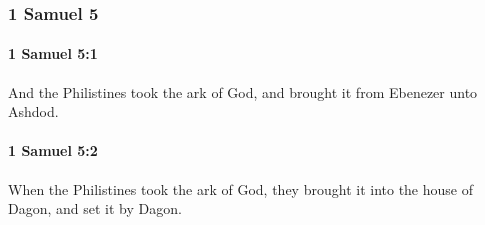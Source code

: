 	\subsubsection{1 Samuel 5} %
		\label{1SAMUEL-5}

		\paragraph{1 Samuel 5:1} %
			\label{1SAMUEL-5-1}

			And the Philistines took the ark of God, and brought it from Ebenezer unto Ashdod.


		\paragraph{1 Samuel 5:2} %
			\label{1SAMUEL-5-2}

			When the Philistines took the ark of God, they brought it into the house of Dagon, and set it by Dagon.

